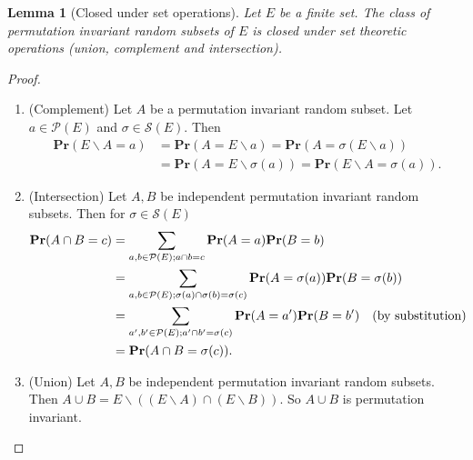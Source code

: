 \documentclass{article}
\def\Pr{\mathbf{Pr}}
\newtheorem{lem}[thm]{Lemma}
\theoremstyle{remark}
\begin{document}
\begin{lem} [Closed under set operations]\label{closed} Let $E$ be a finite set. The class of permutation invariant random subsets of $E$ is closed under set theoretic operations (union, complement and intersection).
\end{lem}
\begin{proof}\quad
\begin{enumerate}[$(i)$]
    \item (Complement) Let $A$ be a permutation invariant random subset. Let $a\in \mathcal{P}(E)$ and $\sigma\in\mathcal{S}(E)$. Then
    \[\begin{split}
        \Pr(E\backslash A = a) & = \Pr(A = E\backslash a) = \Pr(A = \sigma(E\backslash a))\\
        & = \Pr(A = E\backslash \sigma(a)) = \Pr(E\backslash A = \sigma(a)).
    \end{split}\]
    \item (Intersection) Let $A,B$ be independent permutation invariant random subsets. Then for $\sigma\in\mathcal{S}(E)$
    \[
    \begin{split}\Pr(A\cap B = c) & = \sum_{a,b\in\mathcal{P}(E);a\cap b = c}\Pr(A = a)\Pr(B = b) \\
    & = \sum_{a,b\in\mathcal{P}(E);\sigma(a)\cap \sigma(b) = \sigma(c)}\Pr(A = \sigma(a))\Pr(B = \sigma(b))\\
    & = \sum_{a',b'\in\mathcal{P}(E);a'\cap b' = \sigma(c)}\Pr(A = a')\Pr(B = b') \quad (\textup{by substitution})\\
    & = \Pr(A\cap B = \sigma(c)).
    \end{split}\]
    \item (Union) Let $A,B$ be independent permutation invariant random subsets. Then $A\cup B = E\backslash((E\backslash A)\cap (E\backslash B))$. So $A\cup B$ is permutation invariant.
\end{enumerate}
\end{proof}
\end{document}
